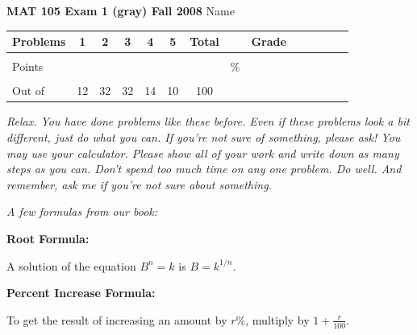 \documentclass[12pt]{article}
\begin{document}
\textbf{MAT 105 Exam 1 (gray) Fall 2008} \hspace{.4in} {\large Name} \hrulefill

\begin{center}

\begin{tabular}
{|l|c|c|c|c|c|c|c|c|c|c|c|c|c|} \hline

 Problems & \hspace{5 pt} 1 \hspace{5 pt}  & \hspace{5 pt} 2 \hspace{5 pt} & \hspace{5 pt} 3 \hspace{5 pt} & \hspace{5 pt} 4 \hspace{5 pt} & \hspace{5 pt} 5 \hspace{5 pt} & \hspace{5 pt} Total  \hspace{5 pt} & &  \hspace{5 pt} Grade \hspace{5 pt}  \\ \hline
&&&&&&&&\\  
Points &&&&&&&    \hspace{.8in}\% &  \\ 
&&&&&&&& \\  \hline
Out of & 12 & 32 & 32 & 14 & 10 &100 & & \\ \hline

\end {tabular}

\end{center}

\vspace{.2in}

 \emph{Relax.  You have done problems like these before.  Even if these problems look a bit different, just do what you can.  If you're not sure of something, please ask! You may use your calculator.  Please show all of your work and write down as many steps as you can.  Don't spend too much time on any one problem.  Do well.  And remember, ask me if you're not sure about something.}
 
\emph{A few formulas from our book:}

\begin{center}

\textbf{Root Formula:} 

A solution of the equation $B^n=k$ is $B=k^{1/n}$.

\vspace{.2in} 

\textbf{Percent Increase Formula:} 

To get the result of increasing an amount by $r$\%, multiply by $1 + \frac{r}{100}$.

\end{center}
\end{document}
